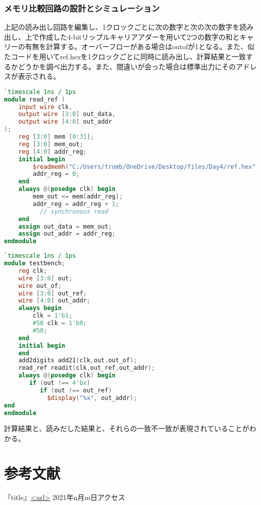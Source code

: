 \documentclass{ltjsarticle}
\begin{document}
\subsubsection{メモリ比較回路の設計とシミュレーション}
上記の読み出し回路を編集し、1クロックごとに次の数字と次の次の数字を読み出し、上で作成した4-bitリップルキャリアアダーを用いて2つの数字の和とキャリーの有無を計算する。オーバーフローがある場合はoutofが1となる。また、似たコードを用いてref.hexを1クロックごとに同時に読み出し、計算結果と一致するかどうかを調べ出力する。また、間違いが会った場合は標準出力にそのアドレスが表示される。
\begin{lstlisting}[caption=メモリ比較回路デザイン,language=verilog]
`timescale 1ns / 1ps
module read_ref ( 
    input wire clk,
    output wire [3:0] out_data,
    output wire [4:0] out_addr
);
    reg [3:0] mem [0:31];
    reg [3:0] mem_out;
    reg [4:0] addr_reg;
    initial begin
        $readmemh("C:/Users/tromb/OneDrive/Desktop/files/Day4/ref.hex", mem);
        addr_reg = 0;
    end
    always @(posedge clk) begin
        mem_out <= mem[addr_reg];
        addr_reg = addr_reg + 1;
          // synchronous read
    end
    assign out_data = mem_out;
    assign out_addr = addr_reg;
endmodule
\end{lstlisting}
\begin{lstlisting}[caption=メモリ比較回路テストベンチ,language=verilog]
`timescale 1ns / 1ps
module testbench;
	reg clk;
	wire [3:0] out;
	wire out_of;
	wire [3:0] out_ref;
	wire [4:0] out_addr;
	always begin
		clk = 1'b1;
		#50 clk = 1'b0;
		#50;
	end
	initial begin  
	end
	add2digits add21(clk,out,out_of);
	read_ref readit(clk,out_ref,out_addr);
	always @(posedge clk) begin
	   if (out !== 4'bx)
	   	  if (out !== out_ref)
	        $display("%x", out_addr);
end
endmodule
\end{lstlisting}
計算結果と、読みだした結果と、それらの一致不一致が表現されていることがわかる。
\section{参考文献}
『title』\url{<url>} 2021年n月m日アクセス
\end{document}
